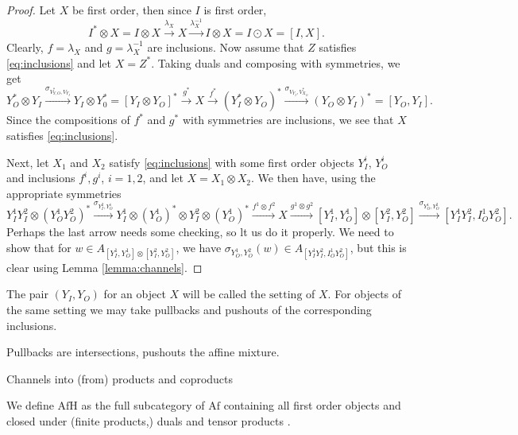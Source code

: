 \documentclass[12pt]{article}
\theoremstyle{definition}
\theoremstyle{remark}
\def\type{\mathrm {setting}}
\def \Afh{\mathrm{AfH}}
\def \Af{\mathrm{Af}}
\begin{document}
\begin{proof} Let $X$ be first order, then since $I$ is first order,
\[
I^*\otimes X=I\otimes X \xrightarrow{\lambda_X} X\xrightarrow{\lambda^{-1}_X} I\otimes
X=I\odot X=[I,X].
\]
Clearly, $f=\lambda_X$ and $g=\lambda^{-1}_X$ are inclusions. Now assume that $Z$
satisfies \eqref{eq:inclusions} and let $X=Z^*$. Taking duals and composing with
symmetries, we get
\[
Y_O^*\otimes Y_I\xrightarrow{\sigma_{V_{Y,O}^*,V_{Y_I}}} Y_I\otimes Y_0^*=[Y_I\otimes
Y_O]^*\xrightarrow{g^*} X\xrightarrow{f^*} (Y_I^*\otimes
Y_O)^*\xrightarrow{\sigma_{V_{Y_I},V_{X_O}^*}} (Y_O\otimes Y_I)^*=[Y_O,Y_I].
\]
Since the compositions of $f^*$ and $g^*$ with symmetries are inclusions, we see that $X$
satisfies \eqref{eq:inclusions}.

Next, let $X_1$ and $X_2$ satisfy \eqref{eq:inclusions}  with some first order objects $Y_I^i$, $Y_O^i$ and
inclusions $f^i,g^i$, $i=1,2$, and let $X=X_1\otimes X_2$. We then have, using the
appropriate symmetries
\[
Y_I^1Y_I^2\otimes (Y_O^1Y_O^2)^*\xrightarrow{\sigma_{Y_I^2,Y_O^1}} Y_I^1\otimes
(Y_O^1)^*\otimes Y_I^2\otimes (Y_O^1)^*\xrightarrow{f^1\otimes f^2} X
\xrightarrow{g^1\otimes g^2} [Y_I^1,Y_O^1]\otimes
[Y_I^2,Y_O^2]\xrightarrow{\sigma_{Y_O^1,Y_O^2}}[Y_I^1Y_I^2,I_O^1Y_O^2].
\]
Perhaps the last arrow needs some checking, so lt us do it properly. We need to show that
for $w\in A_{[Y_I^1,Y_O^1]\otimes
[Y_I^2,Y_O^2]}$, we have $\sigma_{Y_O^1,Y_O^2}(w)\in A_{[Y_I^1Y_I^2,I_O^1Y_O^2]}$, but
this is clear using Lemma \ref{lemma:channels}.

\end{proof}

The pair $(Y_I,Y_O)$ for an object $X$ will be called the $\type$ of $X$. For objects of
the same $\type$ we may take
pullbacks and pushouts of the  corresponding inclusions.




Pullbacks are intersections, pushouts the affine mixture.

Channels into (from) products and coproducts

We define $\Afh$ as the full subcategory of $\Af$ containing all first order objects and
closed under (finite products,) duals and  tensor products . 
\end{document}
